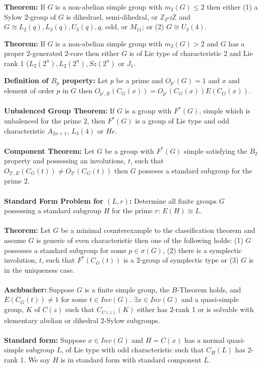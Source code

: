 {\bf Theorem:} If $G$ is a non-abelian simple group with $m_2(G) \le 2$ then either
(1) a Sylow $2$-group of $G$ is dihedrael, semi-dihedral, or
${\mathbb Z}_{2^n} \wr {\mathbb Z}$ and $G \cong L_2(q), L_3(q), U_3(q), q$, odd, or
$M_{11}$; or (2) $G \cong U_3(4)$.
\begin{quote}
\end{quote}
{\bf Theorem:} If $G$ is a non-abelian simple group with $m_2(G) > 2$  and
$G$ has a proper $2$-generated $2$-core then either $G$ is of Lie type of characteristic 2
and Lie rank 1 ($L_2(2^n), L_2(2^n), Sz(2^n)$ or $J_1$.
\begin{quote}
\end{quote}
{\bf Definition of $B_p$ property:}   Let $p$ be a prime and $O_{p'}(G)=1$ and $x$ and element of
order $p$ in $G$ then $O_{p',E}(C_G(x))= O_{p'}(C_G(x))E(C_G(x))$.
\\
\\
{\bf Unbalenced Group Theorem:} If $G$ is a group with $F^*(G)$, simple which is unbalenced for
the prime $2$, then $F^*(G)$ is a group of Lie type and odd characteristic $A_{2n+1}$, $L_3(4)$ or $He$.
\\
\\
{\bf Component Theorem:} Let $G$ be a group with $F^*(G)$ simple satisfying the $B_2$ property
and possessing an involutions, $t$, such that $O_{2',E}(C_G(t)) \ne O_{2'}(C_G(t))$ then
$G$ posseses a standard subgroup for the prime $2$.
\\
\\
{\bf Standard Form Problem for $(L,r)$:}   Determine all finite groups $G$ possessing a standard subgroup $H$ for the prime $r$: $E(H) \cong L$.
\\
\\
{\bf Theorem:} Let $G$ be a minimal counterexample to the classification theorem and assume $G$
is generic of even characteristic then one of the following holds:
(1) $G$ possesses a standard subgroup  for some $p \in \sigma(G)$,
(2) there is a symplectic involution, $t$, such that $F^*(C_G(t))$ is a $2$-group
of symplectic type or (3) $G$ is in the uniqueness case.
\\
\\
{\bf Aschbacher:} Suppose $G$ is a finite simple group, the $B$-Theorem holds, and $E(C_G(t)) \neq 1$
for some $t \in Inv(G)$.  $\exists x \in Inv(G)$ and a quasi-simple group,
$K$ of $C(z)$ such that $C_{C(z)}(K)$ either has $2$-rank 1 or is solvable with elementary abelian
or dihedral $2$-Sylow subgroups.
\\
\\
{\bf Standard form:} Suppose $x \in Inv(G)$ and  $H = C(x)$ has a normal quasi-simple subgroup $L$,
of Lie type with odd characteristic such that $C_H(L)$ has $2$-rank 1.   We say $H$ is in standard
form with standard component $L$.
